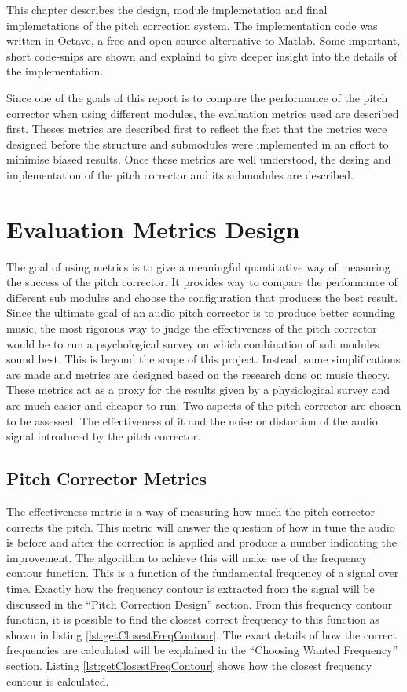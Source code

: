 
This chapter describes the design, module implemetation and final implemetations
of the pitch correction system. The implementation code was written in Octave, a
free and open source alternative to Matlab. Some important, short code-snips are
shown and explaind to give deeper insight into the details of the implementation.

Since one of the goals of this report is to compare the performance of the pitch
corrector when using different modules, the evaluation metrics used are described
first. Theses metrics are described first to reflect the fact that the metrics
were designed before the structure and submodules were implemented in an effort to
minimise biased results. Once these metrics are well understood, the desing and
implementation of the pitch corrector and its submodules are described.

\section{Evaluation Metrics Design}

The goal of using metrics is to give a meaningful quantitative way of measuring
the success of the pitch corrector. It provides way to compare the performance of
different sub modules and choose the configuration that produces the best result.
Since the ultimate goal of an audio pitch corrector is to produce better sounding
music, the most rigorous way to judge the effectiveness of the pitch corrector
would be to run a psychological survey on which combination of sub modules sound
best. This is beyond the scope of this project. Instead, some simplifications are
made and metrics are designed based on the research done on music theory. These
metrics act as a proxy for the results given by a physiological survey and are
much easier and cheaper to run. Two aspects of the pitch corrector are chosen to
be assessed. The effectiveness of it and the noise or distortion of the audio
signal introduced by the pitch corrector.

\subsection{Pitch Corrector Metrics}

The effectiveness metric is a way of measuring how much the pitch corrector
corrects the pitch. This metric will answer the question of how in tune the audio
is before and after the correction is applied and produce a number indicating the
improvement. The algorithm to achieve this will make use of the frequency contour
function. This is a function of the fundamental frequency of a signal over time.
Exactly how the frequency contour is extracted from the signal will be discussed
in the ``Pitch Correction Design'' section. From this frequency contour function,
it is possible to find the closest correct frequency to this function as shown in
listing \ref{lst:getClosestFreqContour}. The
exact details of how the correct frequencies are calculated will be explained in
the ``Choosing Wanted Frequency'' section. Listing \ref{lst:getClosestFreqContour}
shows how the closest frequency contour is calculated.

